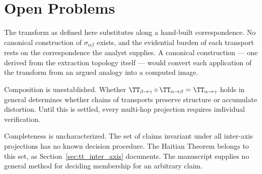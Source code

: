 \section{Open Problems}
\label{sec:tt_open}

The transform as defined here substitutes along a hand-built correspondence. No canonical
construction of $\sigma_{\alpha\beta}$ exists, and the evidential burden of each transport rests
on the correspondence the analyst supplies. A canonical construction --- one derived from the
extraction topology itself --- would convert each application of the transform from an argued
analogy into a computed image.

Composition is unestablished. Whether
$\TT_{\beta \to \gamma} \circ \TT_{\alpha \to \beta} =
\TT_{\alpha \to \gamma}$ holds in general determines whether chains of transports
preserve structure or accumulate distortion. Until this is settled, every multi-hop projection
requires individual verification.

Completeness is uncharacterized. The set of claims invariant under all inter-axis projections has
no known decision procedure. The Haitian Theorem belongs to this set, as
Section~\ref{sec:tt_inter_axis} documents. The manuscript supplies no general method for deciding
membership for an arbitrary claim.
